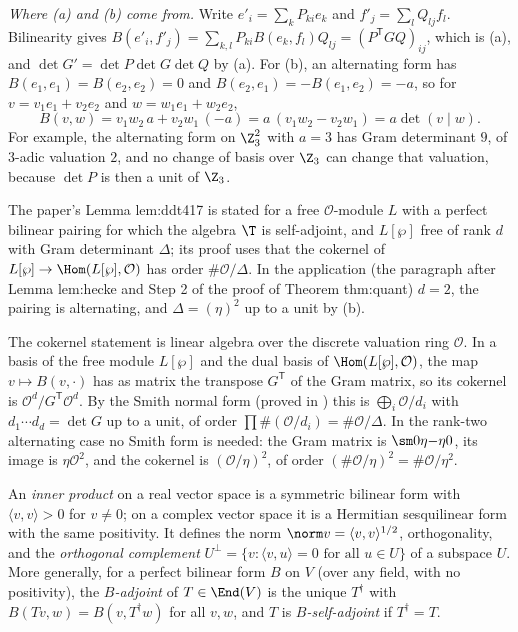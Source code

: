 \emph{Where (a) and (b) come from.} Write $e'_i=\sum_kP_{ki}e_k$ and $f'_j=\sum_lQ_{lj}f_l$. Bilinearity
gives $B(e'_i,f'_j)=\sum_{k,l}P_{ki}B(e_k,f_l)Q_{lj}=(P^{\mathsf T}GQ)_{ij}$, which is (a), and
$\det G'=\det P\det G\det Q$ by (a). For (b), an alternating form has
$B(e_1,e_1)=B(e_2,e_2)=0$ and $B(e_2,e_1)=-B(e_1,e_2)=-a$, so for $v=v_1e_1+v_2e_2$ and
$w=w_1e_1+w_2e_2$,
\[
B(v,w)=v_1w_2\,a+v_2w_1\,(-a)=a\,(v_1w_2-v_2w_1)=a\det(v\mid w).
\]
For example, the alternating form on $\Z_3^2$ with $a=3$ has Gram determinant $9$, of $3$-adic
valuation $2$, and no change of basis over $\Z_3$ can change that valuation, because $\det P$ is then
a unit of $\Z_3$.

\begin{paperlink}\label{pl:prereq:gram}
The paper's Lemma lem:ddt417 is stated for a free $\mathcal O$-module $L$ with a perfect bilinear
pairing for which the algebra $\T$ is self-adjoint, and $L[\wp]$ free of rank $d$ with Gram
determinant $\Delta$; its proof uses that the cokernel of $L[\wp]\to\Hom(L[\wp],\mathcal O)$ has
order $\#\mathcal O/\Delta$. In the application (the paragraph after Lemma lem:hecke and Step 2 of the
proof of Theorem thm:quant) $d=2$, the pairing is alternating, and $\Delta=(\eta)^2$ up to a unit by
(b).

The cokernel statement is linear algebra over the discrete valuation ring $\mathcal O$. In a basis of
the free module $L[\wp]$ and the dual basis of $\Hom(L[\wp],\mathcal O)$, the map
$v\mapsto B(v,\cdot)$ has as matrix the transpose $G^{\mathsf T}$ of the Gram matrix, so its
cokernel is $\mathcal O^d/G^{\mathsf T}\mathcal O^d$. By the Smith normal form (proved in
) this is $\bigoplus_i\mathcal O/d_i$ with $d_1\cdots d_d=\det G$ up to a unit, of
order $\prod\#(\mathcal O/d_i)=\#\mathcal O/\Delta$. In the rank-two alternating case no Smith form
is needed: the Gram matrix is $\sm0\eta{-\eta}0$, its image is $\eta\mathcal O^2$, and the cokernel
is $(\mathcal O/\eta)^2$, of order $(\#\mathcal O/\eta)^2=\#\mathcal O/\eta^2$.
\end{paperlink}

\begin{definition}\label{def:prereq:inner}
An \emph{inner product} on a real vector space is a symmetric bilinear form with
$\langle v,v\rangle>0$ for $v\ne0$; on a complex vector space it is a Hermitian sesquilinear form
with the same positivity. It defines the norm $\norm v=\langle v,v\rangle^{1/2}$, orthogonality,
and the \emph{orthogonal complement} $U^\perp=\{v:\langle v,u\rangle=0\text{ for all }u\in U\}$ of
a subspace $U$. More generally, for a perfect bilinear form $B$ on $V$ (over any field, with no
positivity), the \emph{$B$-adjoint} of $T\in\End(V)$ is the unique $T^\dagger$ with
$B(Tv,w)=B(v,T^\dagger w)$ for all $v,w$, and $T$ is \emph{$B$-self-adjoint} if $T^\dagger=T$.
\end{definition}

